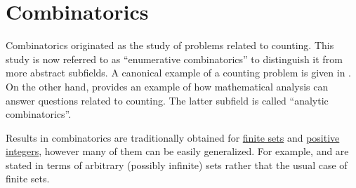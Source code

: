 \chapter{Combinatorics}\label{ch:combinatorics}

Combinatorics originated as the study of problems related to counting. This study is now referred to as \enquote{enumerative combinatorics} to distinguish it from more abstract subfields. A canonical example of a counting problem is given in . On the other hand,  provides an example of how mathematical analysis can answer questions related to counting. The latter subfield is called \enquote{analytic combinatorics}.

Results in combinatorics are traditionally obtained for \hyperref[def:set_finiteness]{finite sets} and \hyperref[def:integer_signum]{positive integers}, however many of them can be easily generalized. For example,  and  are stated in terms of arbitrary (possibly infinite) sets rather that the usual case of finite sets.

